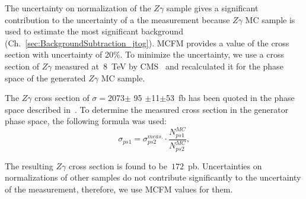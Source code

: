 The uncertainty on normalization of the $Z\gamma$ sample gives a significant contribution to the uncertainty of a the measurement because $Z\gamma$ MC sample is used to estimate the most significant background (Ch.~\ref{sec:BackgroundSubtraction_jtog}). MCFM provides a value of the cross section with uncertainty of 20\%. To minimize the uncertainty, we use a cross section of $Z\gamma$ measured at~8~TeV by CMS~\cite{ref_Zg8TeV} and recalculated it for the phase space of the generated $Z\gamma$ MC sample. 

The $Z\gamma$ cross section of $\sigma = $2073$ \pm$ 95 $\pm$11$ \pm $53~fb has been quoted in the phase space described in~\cite{ref_Zg8TeV}. To determine the measured cross section in the generator phase space, the following formula was used:
\begin{equation}
\sigma_{ps1} = \sigma_{ps2}^{meas.} \cdot \frac{N_{ps1}^{MC}}{N_{ps2}^{MC}},
\end{equation}

The resulting $Z\gamma$ cross section is found to be~$172$~pb. Uncertainties on normalizations of other samples do not contribute significantly to the uncertainty of the measurement, therefore, we use MCFM values for them.


